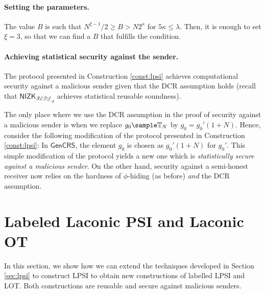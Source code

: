 



\paragraph{Setting the parameters.} The value $B$ is such that $N^{\xi-1}/2\geq B >N 2^\kappa $ for $5\kappa\leq \lambda$. Then, it is enough to set $\xi=3$, so that we can find a $B$ that fulfills the condition.

\paragraph{Achieving statistical security against the sender.} The protocol presented in Construction \ref{const:lpsi} achieves computational security against a malicious sender given that the DCR assumption holds (recall that $\mathsf{NIZK}_{\mathcal{REDJ}_\Delta}$ achieves statistical reusable soundness). 

The only place where we use the DCR assumption in the proof of security against a malicious sender is when we replace $g_0\sample \TT_N$ by $g_0=g_0'(1+N)$. Hence, consider the following modification of the protocol presented in Construction \ref{const:lpsi}: In $\mathsf{GenCRS}$, the element $g_0$ is chosen as $g_0'(1+N)$ for $g_0'$. This simple modification of the protocol yields a new one which is \emph{statistically secure against a malicious sender}. On the other hand, security against a semi-honest receiver now relies on the hardness of $\phi$-hiding (as before) \emph{and} the DCR assumption.

\section{Labeled Laconic PSI and Laconic OT}
\label{sec:ExtensionPSI}


In this section, we show how we can extend the techniques developed in Section \ref{sec:lpsi} to construct LPSI to obtain new constructions of labelled LPSI and LOT. Both constructions are reusable and secure against malicious senders.



